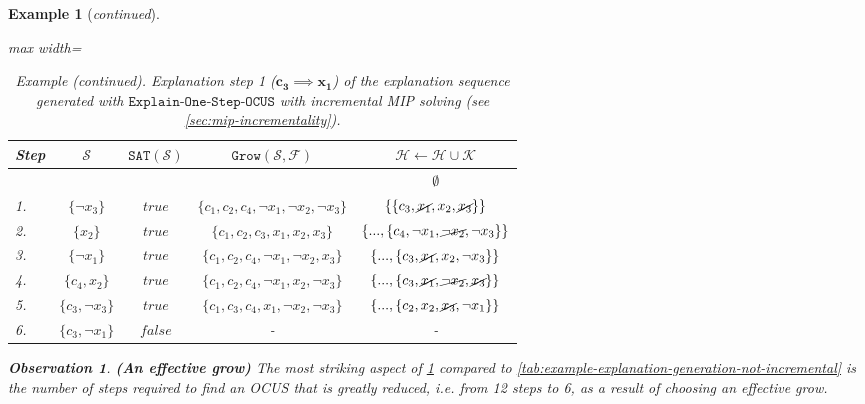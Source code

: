 \documentclass[twoside,11pt]{article}
\newcommand\m[1]{\mathcal{#1}}
\newtheorem{example}{Example}
\newtheorem{observation}[obs]{Observation}
\newcommand\setstohit{\ensuremath{\m{H} }\xspace}
\newcommand\formula{\ensuremath{\m{F} }\xspace}
\newcommand\mm[1]{\ensuremath{#1}\xspace}
\newcommand\call[1]{\mm{\texttt{#1}}}
\newcommand\sat{\texttt{{SAT}}\xspace}
\newcommand\grow{\mm{\call{Grow}}}
\newcommand\onestepo{\ensuremath{\call{Explain-One-Step-OCUS}}\xspace}
\begin{document}
\begin{example}[\textit{continued}]
\begin{table}[!ht]
	\centering
	\begin{adjustbox}{max width=\textwidth}
	\begin{tabular}{lcccc} 
		Step & $\m{S}$                             & $\sat(\m{S})$    &           \textit{$\grow(\m{S}, \formula)$}                     & $\setstohit  \gets \setstohit  \cup \m{K}$ \\ 
		\toprule[1pt]
		&    \phantom{$\{ c_1, c_2, x_1, \lnot x_3 \}$}    &    &      & $\emptyset$                                \\

		1. & $\{\lnot x_3\}$                     & $\mathit{true}$  & $\{c_1 , c_2 , c_4, \lnot x_1 , \lnot x_2 ,  \lnot x_3 \}$ & $\{ \{c_3, \cancel{x_1} , x_2 , \cancel{x_3} \}\}$   
		                            \\  		\midrule
		2. & $\{x_2\}$                     & $\mathit{true}$  & $\{c_1, c_2, c_3, x_1, x_2, x_3 \}$ & $\{ ..., \{c_4, \lnot x_1 ,\cancel{\lnot x_2} , \lnot x_3 \}\}$                               \\  
		\midrule %
		3. & $\{ \lnot x_1\}$                    & $\mathit{true}$  & $\{c_1, c_2, c_4, \lnot x_1, \lnot x_2, x_3 \}$            & $\{ ..., \{c_3, \cancel{x_1}, x_2, \lnot x_3 \}\}$                                \\
		\midrule %
		4. & $\{c_4, x_2\}$                      & $\mathit{true}$  & $\{  c_1 , c_2 , c_4, \lnot x_1 , x_2 , \lnot x_3\}$       & $\{ ..., \{ c_3, \cancel{x_1} , \cancel{\lnot x_2} , \cancel{x_3} \}\}$                        \\ 
		\midrule %
		5. & $\{c_3, \lnot x_3\}$                      & $\mathit{true}$  & $\{  c_1, c_3, c_4, x_1 ,\lnot x_2 , \lnot x_3\}$       & $\{ ..., \{c_2, x_2, \cancel{x_3},  \lnot x_1 \}\}$                        \\ 
		\midrule
		6. & $\{c_3, \lnot x_1\}$  & $\mathit{false}$ & - & - \\%
	\end{tabular}
\end{adjustbox}
	\caption{\textit{Example (continued)}. Explanation step 1 ($\mathbf{c_3 \implies x_1}$) of the explanation sequence generated with \onestepo with incremental MIP solving (see \cref{sec:mip-incrementality}). }
	\label{tab:example-explanation-generation:incr:step1}
\end{table}
\begin{observation}\textbf{(An effective grow)}
 The most striking aspect of \cref{tab:example-explanation-generation:incr:step1} compared to \cref{tab:example-explanation-generation-not-incremental} is the number of steps required to find an OCUS that is greatly reduced, i.e. from 12 steps to 6, as a result of choosing an effective grow. %
\end{observation}


\end{example}
\end{document}
